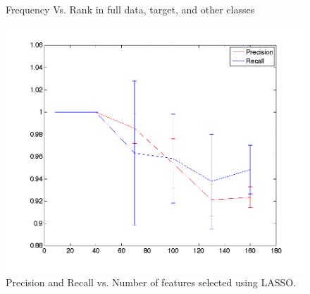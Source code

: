 \begin{center}
\begin{figure}[!ht]
\centering
{}
\caption{Frequency Vs. Rank in full data, target, and other classes}
\label{fig:largecompare}
\end{figure}
\end{center}

\begin{center}
\begin{figure}[!ht]
\centering
\includegraphics[width=.7\textwidth]{../images/precisionrecallExpansion.png}
\caption{Precision and Recall vs. Number of features selected using LASSO.}
\label{fig:precrecall}
\end{figure}
\end{center}

